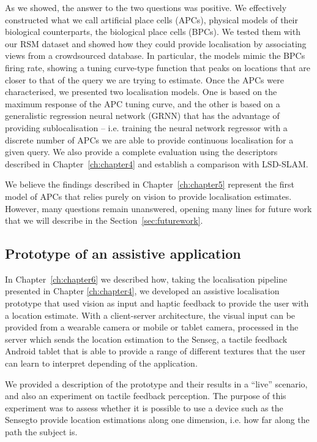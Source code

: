 As we showed, the answer to the two questions was positive. We effectively constructed what we call artificial place cells (APCs), physical models of their biological counterparts, the biological place cells (BPCs). We tested them with our RSM dataset and showed how they could provide localisation by associating views from a crowdsourced database. In particular, the models mimic the BPCs firing rate, showing a tuning curve-type function that peaks on locations that are closer to that of the query we are trying to estimate. Once the APCs were characterised, we presented two localisation models. One is based on the maximum response of the APC tuning curve, and the other is based on a generalistic regression neural network (GRNN) that has the advantage of providing sublocalisation -- i.e. training the neural network regressor with a discrete number of APCs we are able to provide continuous localisation for a given query. We also provide a complete evaluation using the descriptors described in Chapter~\ref{ch:chapter4} and establish a comparison with LSD-SLAM.

We believe the findings described in Chapter~\ref{ch:chapter5} represent the first model of APCs that relies purely on vision to provide localisation estimates. However, many questions remain unanswered, opening many lines for future work that we will describe in the Section~\ref{sec:futurework}. 

\subsection{Prototype of an assistive application}

In Chapter~\ref{ch:chapter6} we described how, taking the localisation pipeline presented in Chapter \ref{ch:chapter4}, we developed an assistive localisation prototype that used vision as input and haptic feedback to provide the user with a location estimate. With a client-server architecture, the visual input can be provided from a wearable camera or mobile or tablet camera, processed in the server which sends the location estimation to the Senseg\texttrademark, a tactile feedback Android tablet that is able to provide a range of different textures that the user can learn to interpret depending of the application.

We provided a description of the prototype and their results in a ``live'' scenario, and also an experiment on tactile feedback perception. The purpose of this experiment was to assess whether it is possible to use a device such as the Senseg\texttrademark to provide location estimations along one dimension, i.e. how far along the path the subject is. 

